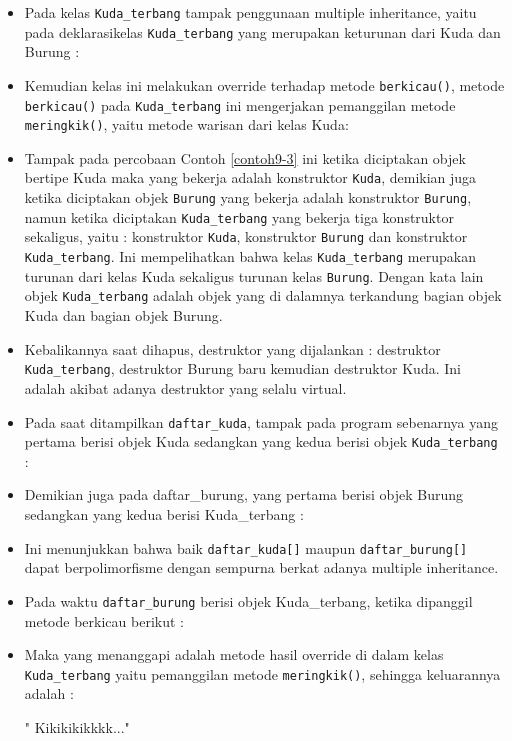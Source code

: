 \begin{itemize}
\item
  Pada kelas \texttt{Kuda\_terbang} tampak penggunaan multiple
  inheritance, yaitu pada deklarasikelas \texttt{Kuda\_terbang} yang
  merupakan keturunan dari Kuda dan Burung :


\item
  Kemudian kelas ini melakukan override terhadap metode
  \texttt{berkicau()}, metode \texttt{berkicau()} pada
  \texttt{Kuda\_terbang} ini mengerjakan pemanggilan metode
  \texttt{meringkik()}, yaitu metode warisan dari kelas Kuda:


\item
  Tampak pada percobaan Contoh \ref{contoh9-3} ini ketika diciptakan objek bertipe
  Kuda maka yang bekerja adalah konstruktor \texttt{Kuda}, demikian juga
  ketika diciptakan objek \texttt{Burung} yang bekerja adalah
  konstruktor \texttt{Burung}, namun ketika diciptakan
  \texttt{Kuda\_terbang} yang bekerja tiga konstruktor sekaligus, yaitu
  : konstruktor \texttt{Kuda}, konstruktor \texttt{Burung} dan
  konstruktor \texttt{Kuda\_terbang}. Ini mempelihatkan bahwa kelas
  \texttt{Kuda\_terbang} merupakan turunan dari kelas Kuda sekaligus
  turunan kelas \texttt{Burung}. Dengan kata lain objek
  \texttt{Kuda\_terbang} adalah objek yang di dalamnya terkandung bagian
  objek Kuda dan bagian objek Burung.
\item
  Kebalikannya saat dihapus, destruktor yang dijalankan : destruktor
  \texttt{Kuda\_terbang}, destruktor Burung baru kemudian destruktor
  Kuda. Ini adalah akibat adanya destruktor yang selalu virtual.
\item
  Pada saat ditampilkan \texttt{daftar\_kuda}, tampak pada program
  sebenarnya yang pertama berisi objek Kuda sedangkan yang kedua berisi
  objek \texttt{Kuda\_terbang} :


\item
  Demikian juga pada daftar\_burung, yang pertama berisi objek Burung
  sedangkan yang kedua berisi Kuda\_terbang :


\item
  Ini menunjukkan bahwa baik \texttt{daftar\_kuda{[}{]}} maupun
  \texttt{daftar\_burung{[}{]}} dapat berpolimorfisme dengan sempurna
  berkat adanya multiple inheritance.
\item
  Pada waktu \texttt{daftar\_burung} berisi objek Kuda\_terbang, ketika
  dipanggil metode berkicau berikut :


\item
  Maka yang menanggapi adalah metode hasil override di dalam kelas
  \texttt{Kuda\_terbang} yaitu pemanggilan metode \texttt{meringkik()},
  sehingga keluarannya adalah :

\begin{lcverbatim}
" Kikikikikkkk..."
\end{lcverbatim}
\end{itemize}

